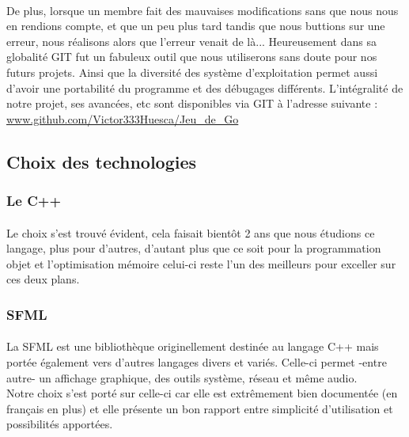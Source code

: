             \paragraph{}De plus, lorsque un membre fait des mauvaises modifications sans que nous nous en rendions compte,  et que un peu plus tard tandis que nous buttions sur une erreur, nous réalisons alors que l'erreur venait de là... Heureusement dans sa globalité GIT fut un fabuleux outil que nous utiliserons sans doute pour nos futurs projets. Ainsi que la diversité des système d'exploitation permet aussi d'avoir une portabilité du programme et des débugages différents.
            L'intégralité de notre projet, ses avancées, etc sont disponibles via GIT à l'adresse suivante : \href{https://github.com/Victor333Huesca/Jeu\_de\_Go}{www.github.com/Victor333Huesca/Jeu\_de\_Go}

        \subsection{Choix des technologies}
            \subsubsection{Le C++}
                \paragraph{}Le choix s'est trouvé évident, cela faisait bientôt 2 ans que nous étudions ce langage, plus pour d'autres, d'autant plus que ce soit pour la programmation objet et l'optimisation mémoire celui-ci reste l'un des meilleurs pour exceller sur ces deux plans.
        
            \subsubsection{SFML}
                \paragraph{}La SFML est une bibliothèque originellement destinée au langage C++ mais portée également vers d'autres langages divers et variés. Celle-ci permet -entre autre- un affichage graphique, des outils système, réseau et même audio.\\
                Notre choix s'est porté sur celle-ci car elle est extrêmement bien documentée (en français en plus) et elle présente un bon rapport entre simplicité d'utilisation et possibilités apportées.

